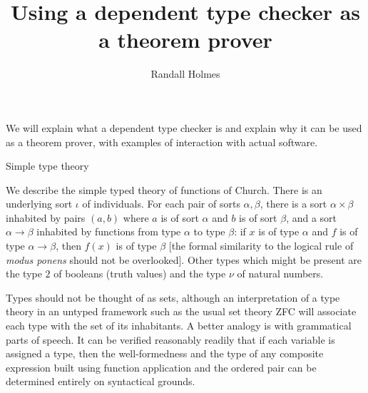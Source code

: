 \documentclass[12pt]{slides}
\title{Using a dependent type checker as a theorem prover}
\author{Randall Holmes}
\begin{document}
\begin{slide}

\maketitle



We will explain what a dependent type checker is and explain why it can be used as a theorem prover, with examples
of interaction with actual software.



\end{slide}

\begin{slide}

{\Large Simple type theory}

We describe the simple typed theory of functions of Church.  There is an underlying sort $\iota$ of individuals.  For each pair of sorts $\alpha, \beta$,
there is a sort $\alpha \times \beta$ inhabited by pairs $(a,b)$ where $a$ is of sort $\alpha$ and $b$ is of sort $\beta$, and a sort $\alpha \rightarrow \beta$
inhabited by functions from type $\alpha$ to type $\beta$:  if $x$ is of type $\alpha$ and $f$ is of type $\alpha \rightarrow \beta$, then $f(x)$ is of type $\beta$
[the formal similarity to the logical rule of {\em modus ponens\/} should not be overlooked].  Other types which might be present are the type $2$ of
booleans (truth values) and the type $\nu$ of natural numbers.


\end{slide}

\begin{slide}

Types should not be thought of as sets, although an interpretation of a type theory in an untyped framework such as the usual set theory ZFC will associate each type with the set of its inhabitants.   A better analogy is with grammatical parts of speech.  It can be verified reasonably readily that if each variable
is assigned a type, then the well-formedness and the type of any composite expression built using function application and the ordered pair can be  determined
entirely on syntactical grounds.  

\end{slide}
\end{document}
